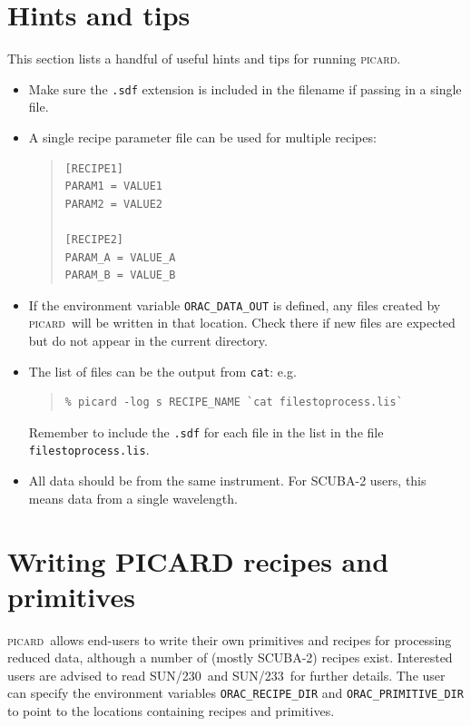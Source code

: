 \documentclass[twoside,11pt]{article}
\newcommand{\xref}[3]{#1}
\renewcommand{\_}{\texttt{\symbol{95}}}
\newenvironment{myquote}{\begin{quote}\begin{small}}{\end{small}\end{quote}}
\newcommand{\oracsun}{\xref{SUN/230}{sun230}{}}
\newcommand{\oracprogsun}{\xref{SUN/233}{sun233}{}}
\newcommand{\picard}{\textsc{picard}}
\begin{document}
\section{Hints and tips\label{se:hints}}

This section lists a handful of useful hints and tips for running
\picard.

\begin{itemize}

\item
Make sure the \verb+.sdf+ extension is included in the filename if
passing in a single file.

\item A single recipe parameter file can be used for multiple recipes:
\begin{myquote}
\begin{verbatim}
[RECIPE1]
PARAM1 = VALUE1
PARAM2 = VALUE2

[RECIPE2]
PARAM_A = VALUE_A
PARAM_B = VALUE_B
\end{verbatim}
\end{myquote}

\item If the environment variable \verb+ORAC_DATA_OUT+ is defined, any
  files created by \picard\ will be written in that location. Check
  there if new files are expected but do not appear in the current
  directory.

\item The list of files can be the output from \texttt{cat}: e.g.\
\begin{myquote}
\begin{verbatim}
% picard -log s RECIPE_NAME `cat filestoprocess.lis`
\end{verbatim}
\end{myquote}
Remember to include the \verb+.sdf+ for each file in the list in the
file \verb+filestoprocess.lis+.

\item All data should be from the same instrument. For SCUBA-2 users,
  this means data from a single wavelength.

\end{itemize}

\section{Writing PICARD recipes and primitives\label{se:write}}

\picard\ allows end-users to write their own primitives and recipes
for processing reduced data, although a number of (mostly SCUBA-2)
recipes exist. Interested users are advised to read \oracsun\ and
\oracprogsun\ for further details. The user can specify the
environment variables \verb+ORAC_RECIPE_DIR+ and
\verb+ORAC_PRIMITIVE_DIR+ to point to the locations containing recipes
and primitives.
\end{document}
